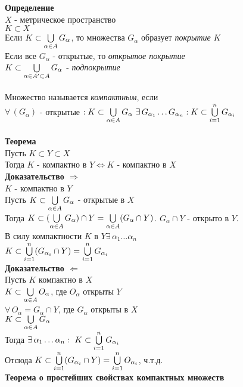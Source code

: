 \documentclass[12pt]{article}
\begin{document}
\textbf{Определение}\\
$X$ - метрическое пространство\\
$K\subset X$\\
Если $K \subset \bigcup\limits_{\alpha \in A} G_\alpha$, то множества $G_\alpha$ образует \textit{покрытие} $K$\\
Если все $G_\alpha$ - открытые, то \textit{открытое покрытие}\\
$K \subset \bigcup\limits_{\alpha \in A' \subset A} G_\alpha $ - \textit{подпокрытие}\\\\
Множество называется \textit{компактным}, если \\
$\forall\,(G_\alpha)$ - открытые $: K \subset \bigcup\limits_{\alpha \in A} G_\alpha\ \exists\,G_{\alpha_1}\ldots G_{\alpha_n}: K \subset \bigcup\limits_{i=1}^n G_{\alpha_i}$\\\\
\textbf{Теорема}\\
Пусть $K\subset Y \subset X$\\
Тогда $K$ - компактно в $Y \Leftrightarrow K$ - компактно в $X$\\
\textbf{Доказательство $\Rightarrow$}\\
$K$ - компактно в $Y$\\
Пусть $K \subset \bigcup\limits_{\alpha \in A} G_\alpha$ - открытые в $X$\\
Тогда $K \subset (\bigcup\limits_{\alpha \in A} G_\alpha) \cap Y = \bigcup\limits_{\alpha \in A} (G_\alpha \cap Y)$. $G_\alpha \cap Y$ - открыто в $Y$.\\
В силу компактности $K$ в $Y \exists\,\alpha_1\ldots\alpha_n$\\
$K \subset \bigcup\limits_{i=1}^n (G_{\alpha_i} \cap Y) = \bigcup\limits_{i=1}^n G_{\alpha_i}$\\
\textbf{Доказательство $\Leftarrow$}\\
Пусть $K$ компактно в $X$\\
$K \subset \bigcup\limits_{\alpha\in A} O_\alpha$, где $O_\alpha$ открыты $Y$\\
$\forall\,O_\alpha =G_\alpha \cap Y$, где $G_\alpha$ открыты в $X$\\
$K \subset \bigcup\limits_{\alpha \in A} G_\alpha$\\
Тогда $\exists\,\alpha_1\ldots\alpha_n:\ K \subset \bigcup\limits_{i=1}^n G_{\alpha_i}$\\
Отсюда $K \subset \bigcup\limits_{i=1}^n (G_{\alpha_i} \cap Y) = \bigcup\limits_{i=1}^n O_{\alpha_i}$, ч.т.д.\\
\textbf{Теорема о простейших свойствах компактных множеств}\\
\end{document}
